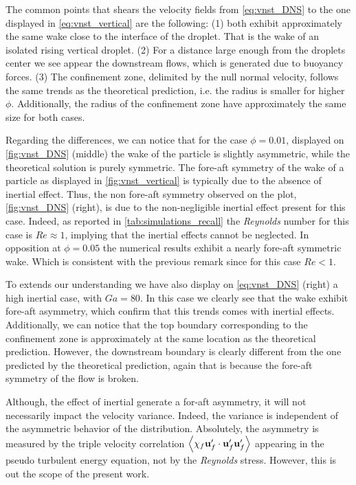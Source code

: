 The common points that shears the velocity fields from \ref{eq:vnst_DNS} to the one displayed in \ref{eq:vnst_vertical} are the following: 
(1) both exhibit approximately the same wake close to the interface of the droplet. 
That is the wake of an isolated rising vertical droplet. 
(2) For a distance large enough  from the droplets center we see appear the downstream flows, which is generated due to buoyancy forces. 
(3) The confinement zone, delimited by the null normal velocity, follows the same trends as the theoretical prediction, i.e. the radius is smaller for higher $\phi$. 
Additionally, the radius of the confinement zone have approximately the same size for both cases. 

Regarding the differences, we can notice that for the case $\phi = 0.01$, displayed on \ref{fig:vnst_DNS} (middle) the wake of the particle is slightly asymmetric, while the theoretical solution is purely symmetric. 
The fore-aft symmetry of the wake of a particle as displayed in \ref{fig:vnst_vertical} is typically due to the absence of inertial effect. 
Thus, the non fore-aft symmetry observed on the plot, \ref{fig:vnst_DNS} (right), is due to the non-negligible inertial effect present for this case. 
Indeed, as reported in \ref{tab:simulations_recall} the \textit{Reynolds} number for this case is $Re \approx 1$, implying that the inertial effects cannot be neglected. 
In opposition at $\phi = 0.05$ the numerical results exhibit a nearly fore-aft symmetric wake. 
Which is consistent with the previous remark since for this case $Re < 1$. 

To extends our understanding we have also display on \ref{eq:vnst_DNS} (right) a high inertial case, with  $Ga = 80$. 
In this case we clearly see that the wake exhibit fore-aft asymmetry, which confirm that this trends comes with inertial effects. 
Additionally, we can notice that the top boundary corresponding to the confinement zone is approximately at the same location as the theoretical prediction. 
However, the downstream boundary is clearly different from the one predicted by the theoretical prediction, again that is because the fore-aft symmetry of the flow is broken.  

Although, the effect of inertial generate a for-aft asymmetry, it will not necessarily impact the velocity variance. 
Indeed, the variance is independent of the asymmetric behavior of the distribution. 
Absolutely, the asymmetry is measured by the triple velocity correlation $\left<\chi_f\textbf{u}_f'\cdot \textbf{u}_f' \textbf{u}_f'\right>$ appearing in the pseudo turbulent energy equation, not by the \textit{Reynolds} stress. 
However, this is out the scope of the present work. 



